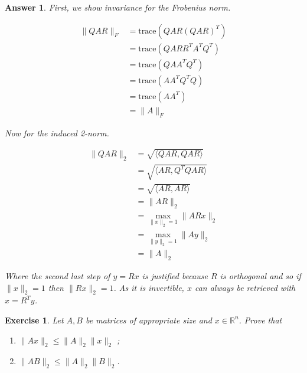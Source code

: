 \documentclass[12pt]{article}
\theoremstyle{colon}
\newtheorem{exercise}{Exercise}
\newtheorem*{answer}{Answer}
\begin{document}
\begin{answer}
  First, we show invariance for the Frobenius norm.

  \begin{align*}
    \lVert QAR \rVert_F &= \text{trace}(QAR(QAR)^T) \\
    &= \text{trace}(QARR^TA^TQ^T) \\
    &= \text{trace}(QAA^TQ^T) \\
    &= \text{trace}(AA^TQ^TQ) \\
    &= \text{trace}(AA^T) \\
    &= \lVert A \rVert_F
  \end{align*}

  Now for the induced 2-norm.

  \begin{align*}
    \lVert QAR \rVert_2 &= \sqrt{\langle QAR, QAR \rangle} \\
    &= \sqrt{\langle AR, Q^TQAR \rangle} \\
    &= \sqrt{\langle AR, AR \rangle} \\
    &= \lVert AR \rVert_2 \\
    &= \max_{\lVert x \rVert_2 = 1} \lVert AR x \rVert_2 \\
    &= \max_{\lVert y \rVert_2 = 1} \lVert Ay \rVert_2 \\
    &= \lVert A \rVert_2
  \end{align*}

  Where the second last step of $y = Rx$ is justified because $R$ is orthogonal and so if $\lVert x \rVert_2 = 1$ then $\lVert R x \rVert_2 = 1$. As it is invertible, $x$ can always be retrieved with $x = R^T y$.
\end{answer}

\clearpage

\begin{exercise}
  Let $A, B$ be matrices of appropriate size and $x \in \mathbb{R}^n$. Prove that

  \begin{enumerate}[label=\alph*)]
    \item $\lVert A x \rVert_2 \leq \lVert A \rVert_2 \lVert x \rVert_2$ ;
    \item $\lVert A B \rVert_2 \leq \lVert A \rVert_2 \lVert B \rVert_2$.
  \end{enumerate}
\end{exercise}
\end{document}
